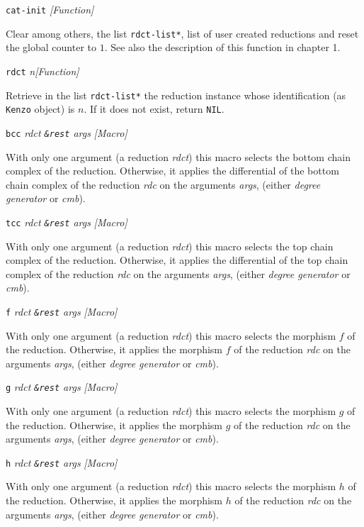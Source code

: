 {\parindent=0mm
{\leftskip=5mm
{\leftskip=5mm
{\tt cat-init} \hfill {\em [Function]} \par}
{\leftskip=15mm
Clear among others, the list {\tt *rdct-list*}, list of user created reductions  and reset
the global counter to $1$. See also the description of this function in chapter 1. \par}
{\tt rdct} {\em n}\hfill {\em [Function]} \par}
{\leftskip=15mm
Retrieve in the list {\tt *rdct-list*} the reduction instance whose identification 
(as {\tt Kenzo} object) is $n$. If it does not exist, return {\tt NIL}. \par}
{\leftskip=5mm
{\tt bcc} {\em rdct {\tt \&rest} args} \hfill {\em [Macro]} \par}
{\leftskip=15mm
With only one argument (a reduction {\em rdct}) this macro selects
the bottom chain complex of the reduction. Otherwise, it applies  the differential 
of the bottom chain complex of the reduction {\em rdc} on the arguments {\em args},
(either {\em degree generator} or {\em cmb}).  \par}
{\leftskip=5mm
{\tt tcc} {\em rdct {\tt \&rest} args} \hfill {\em [Macro]} \par}
{\leftskip=15mm
With only one argument (a reduction {\em rdct}) this macro selects
the top chain complex of the reduction. Otherwise, it applies  the differential 
of the top chain complex of the reduction {\em rdc} on the arguments {\em args},
(either {\em degree generator} or {\em cmb}).  \par}
{\leftskip=5mm
{\tt f} {\em rdct {\tt \&rest} args} \hfill {\em [Macro]} \par}
{\leftskip=15mm
With only one argument (a reduction {\em rdct}) this macro selects
the morphism $f$ of the reduction. Otherwise, it applies  the morphism $f$
of the reduction {\em rdc} on the arguments {\em args},
(either {\em degree generator} or {\em cmb}).  \par}
{\leftskip=5mm
{\tt g} {\em rdct {\tt \&rest} args} \hfill {\em [Macro]} \par}
{\leftskip=15mm
With only one argument (a reduction {\em rdct}) this macro selects
the morphism $g$ of the reduction. Otherwise, it applies  the morphism $g$
of the reduction {\em rdc} on the arguments {\em args},
(either {\em degree generator} or {\em cmb}).  \par}
{\leftskip=5mm
{\tt h} {\em rdct {\tt \&rest} args} \hfill {\em [Macro]} \par}
{\leftskip=15mm
With only one argument (a reduction {\em rdct}) this macro selects
the morphism $h$ of the reduction. Otherwise, it applies  the morphism $h$
of the reduction {\em rdc} on the arguments {\em args},
(either {\em degree generator} or {\em cmb}).  \par}
}
